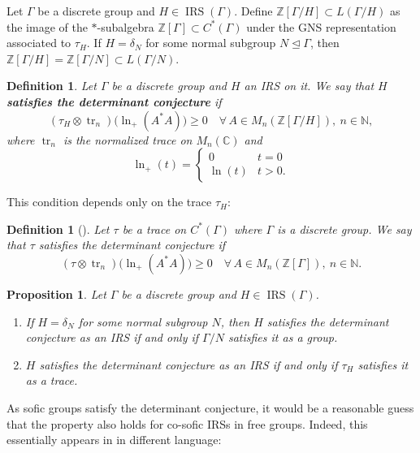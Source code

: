 \documentclass[pdflatex,sn-mathphys-num]{sn-jnl}%
\newtheorem{proposition}[theorem]{Proposition}
\newtheorem{definition}[theorem]{Definition}
\DeclareMathOperator{\tr}{tr}
\newcommand{\IRS}{\operatorname{IRS}}
\begin{document}
Let $\Gamma$ be a discrete group and $H \in \IRS(\Gamma)$.  
Define $\mathbb{Z}[\Gamma/H] \subset L(\Gamma/H)$ as the image of the $*$-subalgebra $\mathbb{Z}[\Gamma] \subset C^*(\Gamma)$ under the GNS representation associated to $\tau_H$.  
If $H = \delta_N$ for some normal subgroup $N \trianglelefteq \Gamma$, then $\mathbb{Z}[\Gamma/H] = \mathbb{Z}[\Gamma/N] \subset L(\Gamma/N)$.

\begin{definition}
    Let $\Gamma$ be a discrete group and $H$ an IRS on it.  
    We say that $H$ \textbf{satisfies the determinant conjecture} if
    \[
        (\tau_H \otimes \tr_n)\big(\ln_+(A^*A)\big) \geq 0
        \quad \forall\, A \in M_n(\mathbb{Z}[\Gamma/H]), \ n \in \mathbb{N},
    \]
    where $\tr_n$ is the normalized trace on $M_n(\mathbb{C})$ and
    \[
        \ln_+(t) =
        \begin{cases}
            0 & t = 0 \\
            \ln(t) & t > 0.
        \end{cases}
    \]
\end{definition}

This condition depends only on the trace $\tau_H$:

\begin{definition}[\cite{balci_traces_2016}]
    Let $\tau$ be a trace on $C^*(\Gamma)$ where $\Gamma$ is a discrete group.  
    We say that $\tau$ satisfies the determinant conjecture if
    \[
        (\tau \otimes \tr_n)\big(\ln_+(A^*A)\big) \geq 0
        \quad \forall\, A \in M_n(\mathbb{Z}[\Gamma]), \ n \in \mathbb{N}.
    \]
\end{definition}

\begin{proposition}
    Let $\Gamma$ be a discrete group and $H \in \IRS(\Gamma)$.
    \begin{enumerate}
        \item If $H = \delta_N$ for some normal subgroup $N$, then $H$ satisfies the determinant conjecture as an IRS if and only if $\Gamma/N$ satisfies it as a group.
        \item $H$ satisfies the determinant conjecture as an IRS if and only if $\tau_H$ satisfies it as a trace.
    \end{enumerate}
\end{proposition}

As sofic groups satisfy the determinant conjecture, it would be a reasonable guess that the property also holds for co-sofic IRSs in free groups.  Indeed, this essentially appears in \cite{balci_traces_2016} in different language:
\end{document}

